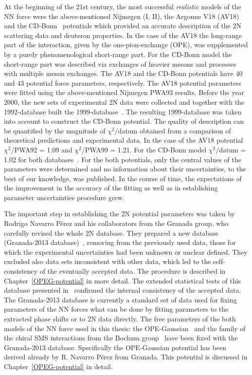 At the beginning of the 21st  century, the most successful \textit{realistic} models of the NN force were the above-mentioned Nijmegen (I, II), the Argonne V18 (AV18)~\cite{Wiringa1995} and the CD-Bonn~\cite{Machleidt2001} potentials which provided an accurate description of the 2N scattering data and deuteron properties. In the case of the AV18 the long-range part of the interaction, given by the one-pion-exchange (OPE), was supplemented by a purely phenomenological short-range part. For the CD-Bonn model the short-range part was described via exchanges of heavier mesons and processes with multiple meson exchanges. The AV18 and the CD-Bonn potentials have 40 and 43 potential force parameters, respectively. The AV18 potential parameters were fitted using the above-mentioned Nijmegen PWA93 results. Before the year 2000, the new sets of experimental 2N data were collected and together with the 1992-database built the 1999-database~\cite{Machleidt2001}. The resulting 1999-database was taken into account to construct the CD-Bonn potential. The quality of description can be quantified by the magnitude of $\chi^{2}$/datum obtained from a comparison of theoretical predictions and experimental data. In the case of the AV18 potential $\chi^{2}$/PWA92 = 1.09 and $\chi^{2}$/PWA99 = 1.21. 
For the CD-Bonn model $\chi^{2}$/datum = 1.02 for both databases~\cite{Machleidt2001}. For the both potentials, only the central values of the parameters were determined and no information about their uncertainties, to the best of our knowledge, was published. In the course of time, the expectations of the improvement in the accuracy of the fitting as well as in establishing parameter uncertainties procedure grew. 

The important step in establishing the 2N potential parameters was taken by Rodrigo Navarro P{\'{e}}rez and his collaborators from the Granada group, who carefully revised the whole 2N database. They prepared a new database (Granada-2013 database)~\cite{Perez2013}, removing from the previously used data, those for which the experimental uncertainties had been unknown or unclear defined. They excluded also data sets inconsistent with other data, which led to the self-consistency of the eventually accepted data. The procedure is described in Chapter~\ref{OPEG-potential} in more detail.
The extended statistical tests of this database presented in~\cite{Perez2013} confirmed the internal consistency of the accepted data. The Granada-2013 database is currently a standard set of data used for fixing parameters of the NN forces what can be done by fitting parameters to the extracted phase shifts or to 2N data directly. The free parameters of the both models of the NN force used in this thesis: the OPE-Gaussian~\cite{NavarroPerez2014} and the family of the chiral SMS interactions from the Bochum group~\cite{Reinert2018} have been fixed with the Granada-2013 database. Specifically the OPE-Gaussian potential has been derived already by R. Navarro P{\'{e}}rez from Granada. This potential is discussed in Chapter~\ref{OPEG-potential} in detail.

